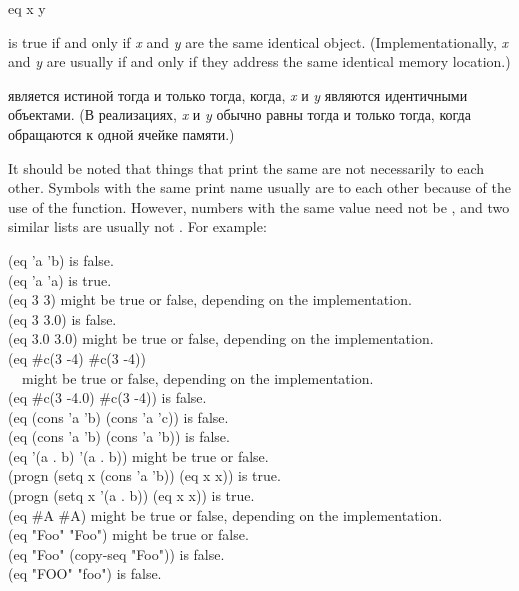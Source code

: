 \begin{defun}[Function]
eq x y

 is true
if and only if \emph{x} and \emph{y} are the same identical object.
(Implementationally, \emph{x} and \emph{y} are usually
 if and only if they address the same identical memory location.)

 является истиной тогда и только тогда, когда,
\emph{x} и \emph{y} являются идентичными объектами.
(В реализациях, \emph{x} и \emph{y} обычно равны  тогда и только
тогда, когда обращаются к одной ячейке памяти.)

It should be noted that things that print the same are not necessarily 
to each other.  Symbols with the same print name usually are  to
each other because of the use of the  function.
However, numbers with the same value
need not be , and two similar lists are usually not .
For example:

\begin{lisp}
(eq 'a 'b) {\rm is false.} \\
(eq 'a 'a) {\rm is true.} \\
(eq 3 3) {\rm might be true or false, depending on the implementation.} \\
(eq 3 3.0) {\rm is false.} \\
(eq 3.0 3.0) {\rm might be true or false, depending on the implementation.} \\
(eq \#c(3 -4) \#c(3 -4)) \\
~~{\rm might be true or false, depending on the implementation.} \\
(eq \#c(3 -4.0) \#c(3 -4)) {\rm is false.} \\
(eq (cons 'a 'b) (cons 'a 'c)) {\rm is false.} \\
(eq (cons 'a 'b) (cons 'a 'b)) {\rm is false.} \\
(eq '(a . b) '(a . b)) {\rm might be true or false.} \\
(progn (setq x (cons 'a 'b)) (eq x x)) {\rm is true.} \\
(progn (setq x '(a . b)) (eq x x)) {\rm is true.} \\
(eq \#{\Xbackslash}A \#{\Xbackslash}A) {\rm might be true or false, depending on the implementation.} \\
(eq "Foo" "Foo") {\rm might be true or false.} \\
(eq "Foo" (copy-seq "Foo")) {\rm is false.} \\
(eq "FOO" "foo") {\rm is false.}
\end{lisp}


\end{defun}
